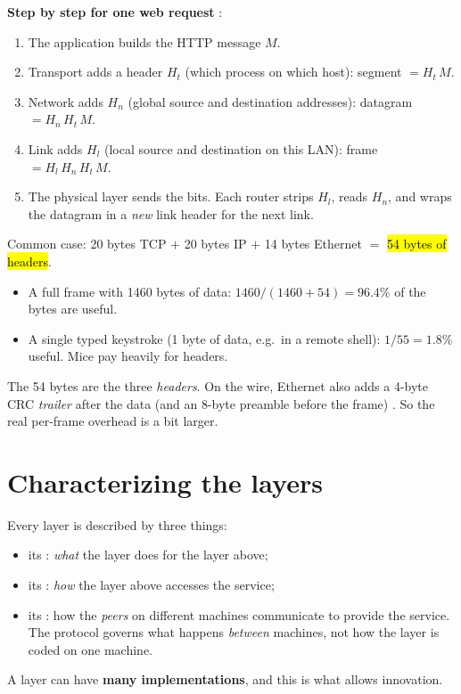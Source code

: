 \textbf{Step by step for one web request} :
\begin{enumerate}
  \item The application builds the HTTP message $M$.
  \item Transport adds a header $H_t$ (which process on which host): segment $=H_t\,M$.
  \item Network adds $H_n$ (global source and destination addresses): datagram $=H_n\,H_t\,M$.
  \item Link adds $H_l$ (local source and destination on this LAN): frame $=H_l\,H_n\,H_t\,M$.
  \item The physical layer sends the bits. Each router strips $H_l$, reads $H_n$, and wraps the datagram in a \emph{new} link header for the next link.
\end{enumerate}

\begin{example}
Common case: 20 bytes TCP $+$ 20 bytes IP $+$ 14 bytes Ethernet $=$ \hl{54 bytes of headers}.
\begin{itemize}
  \item A full frame with 1460 bytes of data: $1460/(1460+54)=96.4\%$ of the bytes are useful.
  \item A single typed keystroke (1 byte of data, e.g.\ in a remote shell): $1/55=1.8\%$ useful. Mice pay heavily for headers.
\end{itemize}
\end{example}

\begin{pitfall}
The 54 bytes are the three \emph{headers}. On the wire, Ethernet also adds a 4-byte CRC \emph{trailer} after the data (and an 8-byte preamble before the frame) .
So the real per-frame overhead is a bit larger.
\end{pitfall}

\section{Characterizing the layers}

\begin{defn}
Every layer is described by three things:
\begin{itemize}
  \item its : \emph{what} the layer does for the layer above;
  \item its : \emph{how} the layer above accesses the service;
  \item its : how the \emph{peers} on different machines communicate to provide the service. The protocol governs what happens
        \emph{between} machines, not how the layer is coded on one machine.
\end{itemize}
A layer can have \textbf{many implementations}, and this is what allows innovation.
\end{defn}

